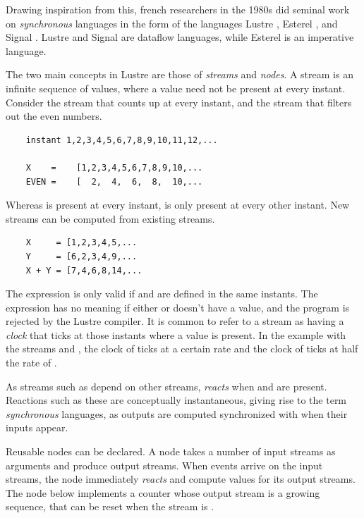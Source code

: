 Drawing inspiration from this, french researchers in the 1980s did seminal work on \textit{synchronous} languages in the
form of the languages Lustre \cite{DBLP:conf/popl/CaspiPHP87}, Esterel \cite{DBLP:journals/scp/BerryG92},
and Signal \cite{DBLP:journals/scp/BenvenisteGJ91}. Lustre and Signal are dataflow languages, while Esterel
is an imperative language.

The two main concepts in Lustre are those of \textit{streams} and \textit{nodes}. A stream is an infinite sequence of values,
where a value need not be present at every instant. Consider the stream  that counts up at every instant, and
the stream  that filters out the even numbers.

\begin{verbatim}
    instant 1,2,3,4,5,6,7,8,9,10,11,12,...

    X    =    [1,2,3,4,5,6,7,8,9,10,...
    EVEN =    [  2,  4,  6,  8,  10,...
\end{verbatim}

Whereas  is present at every instant,  is only present at every other instant. New streams can be computed
from existing streams.

\begin{verbatim}
    X     = [1,2,3,4,5,...
    Y     = [6,2,3,4,9,...
    X + Y = [7,4,6,8,14,...
\end{verbatim}

The expression  is only valid if  and  are defined in the same instants. The expression
 has no meaning if either  or  doesn't have a value, and the program is rejected by the Lustre
compiler. It is common to refer to a stream as having a \textit{clock} that ticks at those instants where a value is
present. In the example with the streams  and , the clock of  ticks at a certain rate and
the clock of  ticks at half the rate of .

As streams such as  depend on other streams,  \textit{reacts} when  and  are
present. Reactions such as these are conceptually instantaneous, giving rise to the term \textit{synchronous} languages,
as outputs are computed synchronized with when their inputs appear.

Reusable nodes can be declared. A node takes a number of input streams as arguments and produce output streams. When events
arrive on the input streams, the node immediately \textit{reacts} and compute values for its output streams. The node below
implements a counter whose output stream is a growing sequence, that can be reset when the  stream is .

